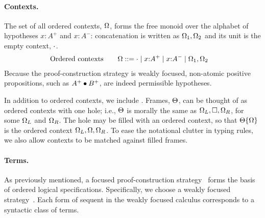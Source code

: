 \documentclass[
  class=../hdeyoung-proposal,
  crop=false
]{standalone}
\begin{document}
\paragraph{Contexts.}\label{sec:contexts}
The set of all ordered contexts, $\Omega$, forms the free monoid over the alphabet of hypotheses $x{:}A^+$ and $x{:}A^-$: concatenation is written as $\Omega_1, \Omega_2$ and its unit is the empty context, $\cdot$.
\begin{alignat*}{2}
  &\text{Ordered contexts}\quad & \Omega &::= \cdot \mid x{:}A^+ \mid x{:}A^- \mid \Omega_1, \Omega_2
\end{alignat*}
Because the proof-construction strategy is weakly focused, non-atomic positive propositions, such as $A^+ \bullet B^+$, are indeed permissible hypotheses.

In addition to ordered contexts, we include .
Frames, $\Theta$, can be thought of as ordered contexts with one hole; i.e., $\Theta$ is morally the same as $\Omega_L, \Box, \Omega_R$, for some $\Omega_L$ and $\Omega_R$.
The hole may be filled with an ordered context, so that $\ofill{\octx}$ is the ordered context $\Omega_L, \Omega, \Omega_R$.
To ease the notational clutter in typing rules, we also allow contexts to be matched against filled frames.

\paragraph{Terms.}\label{sec:terms}

As previously mentioned, a focused proof-construction strategy~\autocite{Andreoli:JLC92} forms the basis of ordered logical specifications.
Specifically, we choose a weakly focused strategy~\autocite{Simmons+Pfenning:CMU11}.
Each form of sequent in the weakly focused calculus corresponds to a syntactic class of terms.
\end{document}
